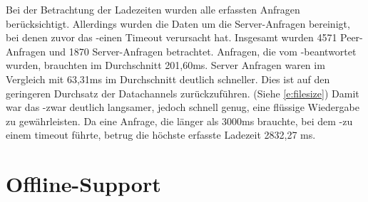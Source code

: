Bei der Betrachtung der Ladezeiten wurden alle erfassten Anfragen berücksichtigt. Allerdings wurden die Daten um die Server-Anfragen bereinigt, bei denen zuvor das \pTp-\cdn einen Timeout verursacht hat. Insgesamt wurden 4571 Peer-Anfragen und 1870 Server-Anfragen betrachtet. 
Anfragen, die vom \pTp-\cdn beantwortet wurden, brauchten im Durchschnitt 201,60ms. Server Anfragen waren im Vergleich mit 63,31ms im Durchschnitt deutlich schneller. Dies ist auf den geringeren Durchsatz der \webrtc Datachannels zurückzuführen. (Siehe \ref{e:filesize}) Damit war das \pTp-\cdn zwar deutlich langsamer, jedoch schnell genug, eine flüssige Wiedergabe zu gewährleisten. Da eine Anfrage, die länger als 3000ms brauchte, bei dem \pTp-\cdn zu einem timeout führte, betrug die höchste erfasste Ladezeit 2832,27 ms.    


\section{Offline-Support}

